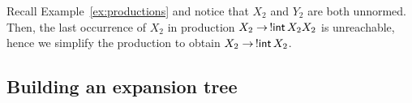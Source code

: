 


\begin{example}
  \label{ex:prune}
  Recall Example~\ref{ex:productions} and notice that $X_2$ and $Y_2$
  are both unnormed. Then, the last occurrence of $X_2$ in production
  $X_2 \rightarrow \,!\mathsf{int}\, X_2 X_2$ is unreachable, hence we
  simplify the production to obtain $X_2 \rightarrow \,!\mathsf{int}\, X_2$.
\end{example}

\subsection{Building an expansion tree}


